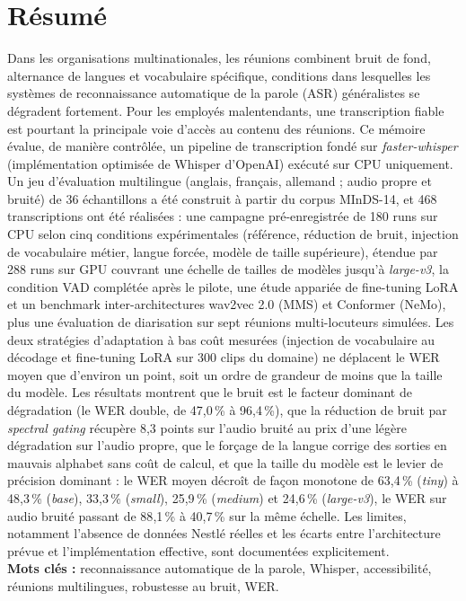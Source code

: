 \documentclass[12pt]{report}
\begin{document}
\section*{Résumé}
Dans les organisations multinationales, les réunions combinent bruit de fond, alternance de langues et vocabulaire spécifique, conditions dans lesquelles les systèmes de reconnaissance automatique de la parole (ASR) généralistes se dégradent fortement. Pour les employés malentendants, une transcription fiable est pourtant la principale voie d'accès au contenu des réunions. Ce mémoire évalue, de manière contrôlée, un pipeline de transcription fondé sur \textit{faster-whisper} (implémentation optimisée de Whisper d'OpenAI) exécuté sur CPU uniquement. Un jeu d'évaluation multilingue (anglais, français, allemand ; audio propre et bruité) de 36 échantillons a été construit à partir du corpus MInDS-14, et 468 transcriptions ont été réalisées : une campagne pré-enregistrée de 180 runs sur CPU selon cinq conditions expérimentales (référence, réduction de bruit, injection de vocabulaire métier, langue forcée, modèle de taille supérieure), étendue par 288 runs sur GPU couvrant une échelle de tailles de modèles jusqu'à \textit{large-v3}, la condition VAD complétée après le pilote, une étude appariée de fine-tuning LoRA et un benchmark inter-architectures wav2vec 2.0 (MMS) et Conformer (NeMo), plus une évaluation de diarisation sur sept réunions multi-locuteurs simulées. Les deux stratégies d'adaptation à bas coût mesurées (injection de vocabulaire au décodage et fine-tuning LoRA sur 300 clips du domaine) ne déplacent le WER moyen que d'environ un point, soit un ordre de grandeur de moins que la taille du modèle. Les résultats montrent que le bruit est le facteur dominant de dégradation (le WER double, de 47{,}0\,\% à 96{,}4\,\%), que la réduction de bruit par \textit{spectral gating} récupère 8{,}3 points sur l'audio bruité au prix d'une légère dégradation sur l'audio propre, que le forçage de la langue corrige des sorties en mauvais alphabet sans coût de calcul, et que la taille du modèle est le levier de précision dominant : le WER moyen décroît de façon monotone de 63{,}4\,\% (\textit{tiny}) à 48{,}3\,\% (\textit{base}), 33{,}3\,\% (\textit{small}), 25{,}9\,\% (\textit{medium}) et 24{,}6\,\% (\textit{large-v3}), le WER sur audio bruité passant de 88{,}1\,\% à 40{,}7\,\% sur la même échelle. Les limites, notamment l'absence de données Nestlé réelles et les écarts entre l'architecture prévue et l'implémentation effective, sont documentées explicitement.
\\
\textbf{Mots clés :} reconnaissance automatique de la parole, Whisper, accessibilité, réunions multilingues, robustesse au bruit, WER.
\thispagestyle{fancy}
\newpage
\end{document}
